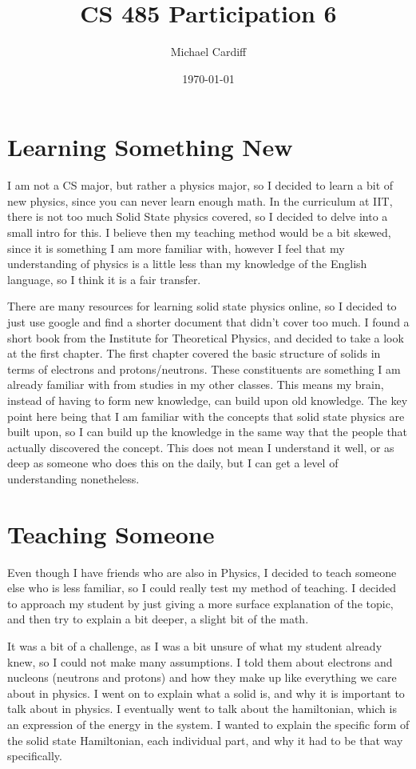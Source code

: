 \documentclass[12pt, letterpaper]{article}
\title{\vspace{-3em}CS 485 Participation 6}
\author{Michael Cardiff}
\date{\today}
\begin{document}
\maketitle
\section{Learning Something New}
I am not a CS major, but rather a physics major, so I decided to learn a bit of new physics, since you can never learn enough math. In the curriculum at IIT, there is not too much Solid State physics covered, so I decided to delve into a small intro for this. I believe then my teaching method would be a bit skewed, since it is something I am more familiar with, however I feel that my understanding of physics is a little less than my knowledge of the English language, so I think it is a fair transfer. 

There are many resources for learning solid state physics online, so I decided to just use google and find a shorter document that didn't cover too much. I found a short book from the Institute for Theoretical Physics, and decided to take a look at the first chapter. The first chapter covered the basic structure of solids in terms of electrons and protons/neutrons. These constituents are something I am already familiar with from studies in my other classes. This means my brain, instead of having to form new knowledge, can build upon old knowledge. The key point here being that I am familiar with the concepts that solid state physics are built upon, so I can build up the knowledge in the same way that the people that actually discovered the concept. This does not mean I understand it well, or as deep as someone who does this on the daily, but I can get a level of understanding nonetheless.
\section{Teaching Someone}
Even though I have friends who are also in Physics, I decided to teach someone else who is less familiar, so I could really test my method of teaching. I decided to approach my student by just giving a more surface explanation of the topic, and then try to explain a bit deeper, a slight bit of the math.

It was a bit of a challenge, as I was a bit unsure of what my student already knew, so I could not make many assumptions. I told them about electrons and nucleons (neutrons and protons) and how they make up like everything we care about in physics. I went on to explain what a solid is, and why it is important to talk about in physics. I eventually went to talk about the hamiltonian, which is an expression of the energy in the system. I wanted to explain the specific form of the solid state Hamiltonian, each individual part, and why it had to be that way specifically.
\end{document}
